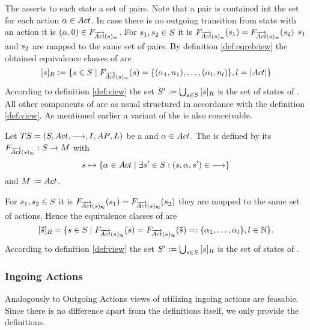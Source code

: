 \documentclass[preview]{standalone}
\begin{document}
The \grpfctN asserts to each state a set of pairs. Note that a pair is contained int the set for each action ${\alpha} \in {Act}$. In case there is no outgoing transition from state \state with an action \action it is $(\action, 0) \in \gfctstrongoutactident$. For ${s}_1, {s}_2 \in {S}$ it is ${{{{F}}_{{\overrightarrow{{Act}}}({s})_=}}}({s}_1) = {{{{F}}_{{\overrightarrow{{Act}}}({s})_=}}}({s}_2)$ \iffN ${s}_1$ and ${s}_2$ are mapped to the same set of pairs. By definition \ref{def:eqrelview} the obtained equivalence classes of \eqrelview are
\[
	\eqclassv{\state} := \{\state \in \states \mid \gfctstrongoutactident(\state) = \{(\action_1, \numoutact_1), \dots, (\action_l, \numoutact_l)\}, l = |\actions|\}
\]
According to definition \ref{def:view} the set ${S}' := \bigcup_{{s} \in {S}} {{[{s}]_{{R}}}}$ is the set of states of \viewstrongoutactident. All other components of \viewstrongoutactident are as usual structured in accordance with the definition \ref{def:view}.
As mentioned earlier a \outactidentweak variant of the \outactident \viewN is also conceivable.

\begin{definition}
	Let ${TS} = {({S}, {Act}, {\longrightarrow}, {I}, {AP}, {L})}$ be a \chosengraphtypeN and ${\alpha} \in {Act}$. The \viewN \viewweakoutactident is defined by its \grpfctN ${{{{F}}_{{\overrightarrow{{Act}}}({s})_\approx}}} : {S} \to {\ensuremath{{M}}}$ with
	\[
	{s} \mapsto \{{\alpha} \in {Act} \mid \exists {s}' \in {S} : ({s}, {\alpha}, {s}') \in {\longrightarrow}\} 	
	\]
	and ${{M}} := {Act}$.
\end{definition}


For ${s}_1, {s}_2 \in {S}$ it is ${{{{F}}_{{\overrightarrow{{Act}}}({s})_\approx}}}({s}_1) = {{{{F}}_{{\overrightarrow{{Act}}}({s})_\approx}}}({s}_2)$ \iffN they are mapped to the same set of actions. Hence the equivalence classes of \eqrelview are
\[
	\eqclassv{\smstate} = \{ \state \in \states \mid \gfctweakoutactident(\state) = \gfctweakoutactident(\smstate) =: \{\action_1, \dots, \action_l\}, l \in \natnums\}.
\]
According to definition \ref{def:view} the set ${S}' := \bigcup_{{s} \in {S}} {{[{s}]_{{R}}}}$ is the set of states of \viewweakoutactident.

\subsubsection{Ingoing Actions}
Analogously to Outgoing Actions views of utilizing ingoing actions are feasable. Since there is no difference apart from the definitions itself, we only provide the definitions.
\end{document}
